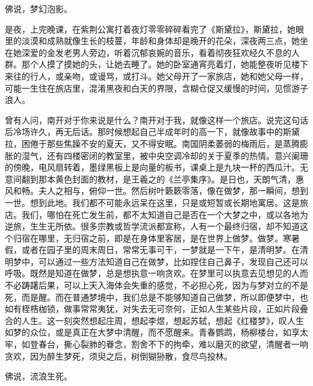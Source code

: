 \documentclass[openany,scheme = chinese, linespread = 1.5]{ctexbook}
\begin{document}
佛说，梦幻泡影。

是夜，上完晚课，在紫荆公寓打着夜灯零零碎碎看完了《斯黛拉》，斯黛拉，她眼里的淡漠和成熟就像生长的枝蔓，年龄和身体却是晚开的花朵，深夜两三点，她坐在她深爱的金发老男人旁边，听着沉郁哀婉的音乐，看着彻夜狂欢经久不息的人群。那个人摸了摸她的头，让她去睡了。她的卧室通宵亮着灯，她能整夜听见楼下来往的行人，或亲吻，或谩骂，或打斗。她父母开了一家旅店，她和她父母一样，可能一生住在旅店里，混淆黑夜和白天的界限，含糊仓促又缓慢的时间，见惯游子浪人。

曾有人问，南开对于你来说是什么？南开对于我，就像这样一个旅店。说完这句话后冷场许久，再无后话。那时候想起自己半成年时的高一下，就像故事中的斯黛拉，困倦于那些焦躁不安的夏天，又不得安眠。南国阴柔萎弱的梅雨后，是蒸腾膨胀的湿气，还有四楼密闭的教室里，被中央空调冷却的关于夏季的热情。意兴阑珊的傍晚，电风扇转着，墨绿黑板上是向量的板书，课桌上是九块一杯的西瓜汁。无意间翻到那本黄色封面的教材，是王羲之的《兰亭集序》。是日也，天朗气清，惠风和畅。夫人之相与，俯仰一世。然后树叶簌簌零落，像在做梦，那一瞬间，想到一世。想到此地。我们都不可能永远呆在这里，只是或短暂或长期地寓居。这是旅店。我们，哪怕在死亡发生前，都不太知道自己是否在一个大梦之中，或以各地为逆旅，生生无所依。很多宗教或哲学流派都宣称，人有一个最终归宿，却不知道这个归宿在哪里，无归宿之前，即是在身体里客居，是在世界上做梦。做梦。寒暑假，或者在园子里的周末周日，常常无事可干，一梦就是一下午，是清明梦。在清明梦中，可以通过一些方法知道自己在做梦，比如捏住自己鼻子，发现自己还可以呼吸。既然是知道在做梦，总是想执意一响贪欢。在梦里可以执意去见想见的人而不必踌躇后果，可以上天入海体会失重的感觉，不必担心死，因为与梦对立的不是死，而是醒。而在普通梦境中，我们总是不能够知道自己做梦，所以即便梦中，也如有桎梏枷锁，做事常常夷犹，对失去无可奈何，正如人生某些片段，正如片段叠合的人生。这一刻突然想起庄周，想起李煜，想起苏轼，想起《红楼梦》，叹人生如梦的众位，或是真正在大梦中清醒，而不愿醒来。青春鹦鹉，杨柳楼台，如享太牢，如登春台，撕心裂肺的眷念，割舍不下的拘牵，难以磨灭的欲望，清醒者一响贪欢，因为醉生梦死，须臾之后，树倒猢狲散，食尽鸟投林。

佛说，流浪生死。
\end{document}
